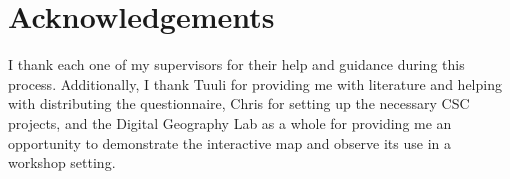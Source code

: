 \section*{Acknowledgements}

I thank each one of my supervisors for their help and guidance during this process.
Additionally,
I thank Tuuli for providing me with literature and
helping with distributing the questionnaire,
Chris for setting up the necessary CSC projects,
and the Digital Geography Lab as a whole
for providing me an opportunity to demonstrate the interactive map
and observe its use in a workshop setting.
